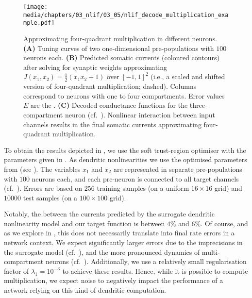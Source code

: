 \begin{figure}
	\centering
	\texttt{[image: media/chapters/03\_nlif/03\_05/nlif\_decode\_multiplication\_example.pdf]}\\[0.25em]
	{\label{fig:nlif_decode_multiplication_example_a}}%
	{\label{fig:nlif_decode_multiplication_example_b}}%
	{\label{fig:nlif_decode_multiplication_example_c}}
	\caption[Approximating four-quadrant multiplication in different $n$-LIF neurons]{
	Approximating four-quadrant multiplication in different \nlif neurons.
	\textbf{(A)} Tuning curves of two one-dimensional pre-populations with $100$ neurons each.
	\textbf{(B)} Predicted somatic currents (coloured contours) after solving for synaptic weights approximating $J(x_1, x_2) = \frac{1}2 (x_1 x_2 + 1)$ over $[-1, 1]^2$ (i.e., a scaled and shifted version of four-quadrant multiplication; dashed).
	Columns correspond to \nlif neurons with one to four compartments.
	Error values $E$ are the \NRMSE.
	\textbf{(C)} Decoded conductance functions for the three-compartment neuron (cf.~). Nonlinear interaction between input channels results in the final somatic currents approximating four-quadrant multiplication.
	}
	\label{fig:nlif_decode_multiplication_example}
\end{figure}

To obtain the results depicted in , we use the soft trust-region optimiser with the parameters given in .
As dendritic nonlinearities we use the optimised parameters from  (see ).
The variables $x_1$ and $x_2$ are represented in separate pre-populations with $100$ neurons each, and each pre-neuron is connected to all target channels (cf.~).
Errors are based on $256$ training samples (on a uniform $16 \times 16$ grid) and $\num{10000}$ test samples (on a $100 \times 100$ grid).

Notably, the \NRMSE between the currents predicted by the surrogate dendritic nonlinearity model and our target function is between $4\%$ and $6\%$.
Of course, and as we explore in , this does not necessarily translate into final rate errors in a network context.
We expect significantly larger errors due to the imprecisions in the surrogate model (cf.~), and the more pronounced dynamics of multi-compartment neurons (cf.~).
Additionally, we use a relatively small regularisation factor of $\lambda_1 = 10^{-3}$ to achieve these results.
Hence, while it is possible to compute multiplication, we expect noise to negatively impact the performance of a network relying on this kind of dendritic computation.

